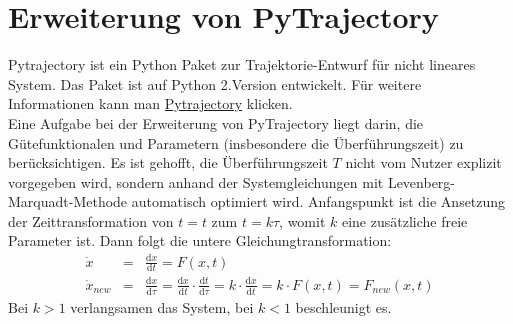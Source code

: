 \section{Erweiterung von PyTrajectory}
\label{Erweiterung_von_PyTrajectory}
Pytrajectory ist ein Python Paket zur Trajektorie-Entwurf für nicht lineares System. Das Paket ist auf Python 2.Version entwickelt. Für weitere Informationen kann man \href{https://pytrajectory.readthedocs.io/en/master/guide/about.html}{Pytrajectory} klicken.\\
Eine Aufgabe bei der Erweiterung von PyTrajectory liegt darin, die Gütefunktionalen und Parametern (insbesondere die Überführungszeit) zu berücksichtigen. Es ist gehofft, die Überführungszeit $T$ nicht vom Nutzer  explizit vorgegeben wird, sondern anhand der Systemgleichungen mit Levenberg-Marquadt-Methode automatisch optimiert wird. Anfangspunkt ist die Ansetzung der Zeittransformation von $t = t$ zum $t = k\tau$, womit $k$ eine zusätzliche freie Parameter ist. Dann folgt die untere Gleichungtransformation:
\begin{eqnarray}
\dot{x} &=& \frac{\mathrm{d} x}{\mathrm{d} t} = F\left ( x,t \right ) \label{eq:ori}\\
\dot{x}_{new} &=& \frac{\mathrm{d} x}{\mathrm{d} \tau} = \frac{\mathrm{d} x}{\mathrm{d} t}\cdot \frac{\mathrm{d} t}{\mathrm{d} \tau} = k\cdot \frac{\mathrm{d} x}{\mathrm{d} t} = k\cdot F(x,t) = F_{new}\left ( x,t \right )\label{eq:mit_k}
\end{eqnarray}
Bei $k>1$ verlangsamen das System, bei $k<1$ beschleunigt es.
